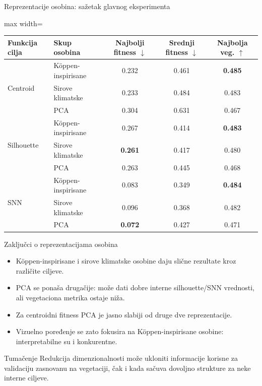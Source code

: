 \documentclass[aspectratio=169,10pt]{beamer}
\newcommand{\betterdown}{\(\downarrow\)}
\newcommand{\betterup}{\(\uparrow\)}
\begin{document}
\begin{frame}{Reprezentacije osobina: sažetak glavnog eksperimenta}
  \begin{adjustbox}{max width=\textwidth}
  \begin{tabular}{llccc}
    \toprule
    Funkcija cilja & Skup osobina & Najbolji fitness \betterdown & Srednji fitness \betterdown & Najbolja veg. \betterup \\
    \midrule
    \multirow{3}{*}{Centroid}
      & K\"oppen-inspirisane & 0.232 & 0.461 & \textbf{0.485} \\
      & Sirove klimatske & 0.233 & 0.484 & 0.483 \\
      & PCA & 0.304 & 0.631 & 0.467 \\
    \midrule
    \multirow{3}{*}{Silhouette}
      & K\"oppen-inspirisane & 0.267 & 0.414 & \textbf{0.483} \\
      & Sirove klimatske & \textbf{0.261} & 0.417 & 0.480 \\
      & PCA & 0.263 & 0.445 & 0.468 \\
    \midrule
    \multirow{3}{*}{SNN}
      & K\"oppen-inspirisane & 0.083 & 0.349 & \textbf{0.484} \\
      & Sirove klimatske & 0.096 & 0.368 & 0.482 \\
      & PCA & \textbf{0.072} & 0.427 & 0.471 \\
    \bottomrule
  \end{tabular}
  \end{adjustbox}
\end{frame}

\begin{frame}{Zaključci o reprezentacijama osobina}
  \begin{itemize}
    \item K\"oppen-inspirisane i sirove klimatske osobine daju slične rezultate kroz različite ciljeve.
    \item PCA se ponaša drugačije: može dati dobre interne silhouette/SNN vrednosti, ali vegetaciona metrika ostaje niža.
    \item Za centroidni fitness PCA je jasno slabiji od druge dve reprezentacije.
    \item Vizuelno poređenje se zato fokusira na K\"oppen-inspirisane osobine: interpretabilne su i konkurentne.
  \end{itemize}

  \vspace{1em}
  \begin{block}{Tumačenje}
    Redukcija dimenzionalnosti može ukloniti informacije korisne za validaciju zasnovanu na vegetaciji, čak i kada sačuva dovoljno strukture za neke interne ciljeve.
  \end{block}
\end{frame}
\end{document}
